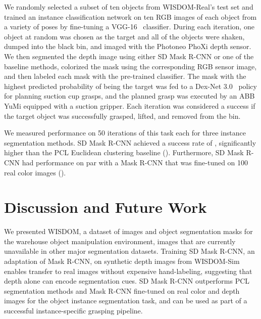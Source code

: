 \documentclass[letterpaper, 10 pt, conference]{ieeeconf}  \pdfoutput=1
\numberwithin{equation}{section}
\begin{document}
We randomly selected a subset of ten objects from WISDOM-Real's test set and trained an instance classification network on ten RGB images of each object from a variety of poses by fine-tuning a VGG-16~\cite{simonyan2014very} classifier.
During each iteration, one object at random was chosen as the target and all of the objects were shaken, dumped into the black bin, and imaged with the Photoneo PhoXi depth sensor.
We then segmented the depth image using either SD Mask R-CNN or one of the baseline methods, colorized the mask using the corresponding RGB sensor image, and then labeled each mask with the pre-trained classifier.
The mask with the highest predicted probability of being the target was fed to a Dex-Net 3.0~\cite{mahler2017dex} policy for planning suction cup grasps, and the planned grasp was executed by an ABB YuMi equipped with a suction gripper.
Each iteration was considered a success if the target object was successfully grasped, lifted, and removed from the bin.

We measured performance on 50 iterations of this task each for three instance segmentation methods.
SD Mask R-CNN achieved a success rate of , significantly higher than the PCL Euclidean clustering baseline ().
Furthermore, SD Mask R-CNN had performance on par with a Mask R-CNN that was fine-tuned on 100 real color images ().





















 \section{Discussion and Future Work}
 We presented WISDOM, a dataset of images and object segmentation masks for the warehouse object manipulation environment, images that are currently unavailable in other major segmentation datasets. Training SD Mask R-CNN, an adaptation of Mask R-CNN, on synthetic depth images from WISDOM-Sim enables transfer to real images without expensive hand-labeling, suggesting that depth alone can encode segmentation cues. SD Mask R-CNN outperforms PCL segmentation methods and Mask R-CNN fine-tuned on real color and depth images for the object instance segmentation task, and can be used as part of a successful instance-specific grasping pipeline.
\end{document}
